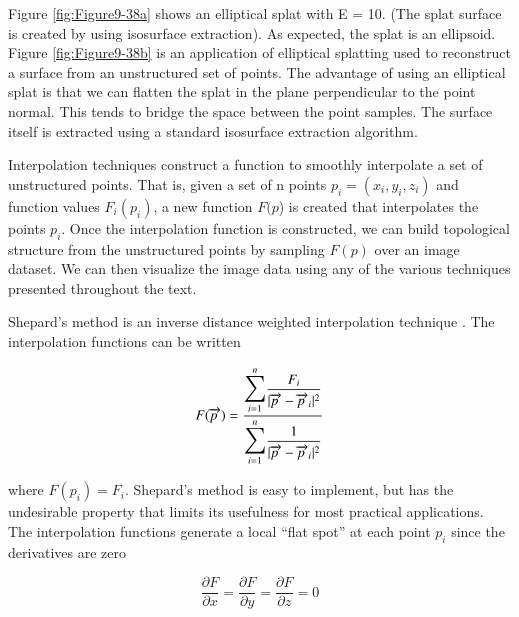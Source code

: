 \begin{description}[leftmargin=0cm,labelindent=0cm]
Figure \ref{fig:Figure9-38a} shows an elliptical splat with E = 10. (The splat surface is created by using isosurface extraction). As expected, the splat is an ellipsoid. Figure \ref{fig:Figure9-38b} is an application of elliptical splatting used to reconstruct a surface from an unstructured set of points. The advantage of using an elliptical splat is that we can flatten the splat in the plane perpendicular to the point normal. This tends to bridge the space between the point samples. The surface itself is extracted using a standard isosurface extraction algorithm.

\item[Interpolation Techniques.]
Interpolation techniques construct a function to smoothly interpolate a set of unstructured points. That is, given a set of n points $p_i = (x_i, y_i, z_i)$ and function values $F_i(p_i)$, a new function $F(p$) is created that interpolates the points $p_i$. Once the interpolation function is constructed, we can build topological structure from the unstructured points by sampling $F(p)$ over an image dataset. We can then visualize the image data using any of the various techniques presented throughout the text. 

Shepard's method is an inverse distance weighted interpolation technique \cite{Wixom78}. The interpolation functions can be written

\begin{equation}\label{eq:9.25}
F(\overrightarrow{p\ }) = \dfrac{\mathlarger{\mathlarger{\sum}}_{i=1}^n \dfrac{F_i}{\vert\overrightarrow{p\ } - \overrightarrow{p\ }_i\vert^2}}{\mathlarger{\mathlarger{\sum}}_{i=1}^n \dfrac{1}{\vert\overrightarrow{p\ } - \overrightarrow{p\ }_i \vert^2}}
\end{equation}

\noindent where $F(p_i) = F_i$. Shepard's method is easy to implement, but has the undesirable property that limits its usefulness for most practical applications. The interpolation functions generate a local ``flat spot'' at each point $p_i$ since the derivatives are zero

\begin{equation}\label{eq:9.26}
\dfrac{\partial F}{\partial x} =
\dfrac{\partial F}{\partial y} =
\dfrac{\partial F}{\partial z} = 0
\end{equation}


\end{description}
